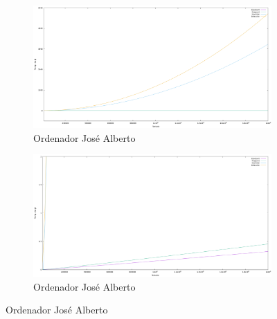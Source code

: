 \documentclass[10pt,a4paper]{article}
\begin{document}
 \begin{figure}[h!]
 	\begin{subfigure}{.5\textwidth}
 		\centering
 		\includegraphics[scale=0.13]{../../Images/Grafica_comparativa_algoritmos_de_ordenacion_Joshoccas.png}
 		\caption{Ordenador José Alberto}
 	\end{subfigure}
 	\hfill
 	\begin{subfigure}{.5\textwidth}
 		\centering
 		\includegraphics[scale=0.13]{../../Images/Grafica_comparativa_algoritmos_ordenacion_Joshoccas_(HyQ).png}
 		\caption{Ordenador José Alberto}
 	\end{subfigure}
 \end{figure}
\end{document}
